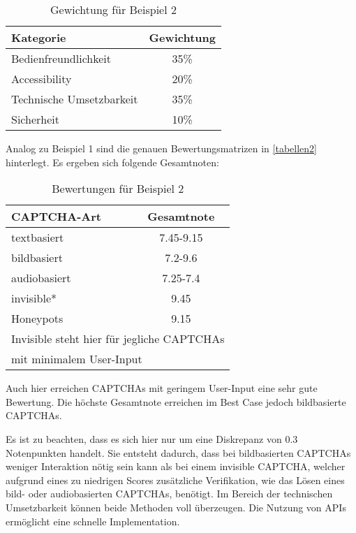 \begin{table}[h!]
    \caption{Gewichtung für Beispiel 2}
    \begin{center}
        \begin{tabular}{l|c}
            Kategorie                       & Gewichtung \\\hline
            Bedienfreundlichkeit            & 35\%         \\
            Accessibility                   & 20\%        \\
            Technische Umsetzbarkeit        & 35\%         \\
            Sicherheit                      & 10\%         
        \end{tabular}
    \end{center}
\end{table}

Analog zu Beispiel 1 sind die genauen Bewertungsmatrizen in \autoref{tabellen2} hinterlegt.
Es ergeben sich folgende Gesamtnoten:

\begin{table}[h!]
    \caption{Bewertungen für Beispiel 2}
    \begin{center}
        \begin{tabular}{l|c}
            CAPTCHA-Art                       & Gesamtnote \\\hline
            textbasiert            & 7.45-9.15        \\
            bildbasiert                   & 7.2-9.6       \\
            audiobasiert        & 7.25-7.4         \\
            invisible*                      & 9.45         \\
            Honeypots & 9.15 \\
           \multicolumn{2}{l}{\footnotesize * Invisible steht hier für jegliche CAPTCHAs} \\
           \multicolumn{2}{l}{\footnotesize   \enspace mit minimalem User-Input}
        \end{tabular}
    \end{center}
\end{table}

Auch hier erreichen CAPTCHAs mit geringem User-Input eine sehr gute Bewertung.
Die höchste Gesamtnote erreichen im Best Case jedoch bildbasierte CAPTCHAs.

Es ist zu beachten, dass es sich hier nur um eine Diskrepanz von 0.3 Notenpunkten handelt. 
Sie entsteht dadurch, dass bei bildbasierten CAPTCHAs weniger Interaktion nötig sein kann als bei einem invisible CAPTCHA,
welcher aufgrund eines zu niedrigen Scores zusätzliche Verifikation, 
wie das Lösen eines bild- oder audiobasierten CAPTCHAs, benötigt.
Im Bereich der technischen Umsetzbarkeit können beide Methoden voll überzeugen. 
Die Nutzung von APIs ermöglicht eine schnelle Implementation.

